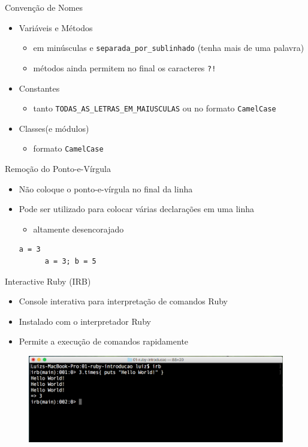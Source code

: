\begin{frame}[fragile,t]{Convenção de Nomes}
  \begin{itemize}
    \item Variáveis e Métodos
    \begin{itemize}
    	\item em minúsculas e \verb!separada_por_sublinhado! (tenha mais de uma palavra)
    	\item métodos ainda permitem no final os caracteres \verb|?!|
    \end{itemize}
    \item Constantes
    \begin{itemize}
    	\item tanto \verb!TODAS_AS_LETRAS_EM_MAIUSCULAS! ou no formato \verb!CamelCase!
    \end{itemize}
    \item Classes(e módulos)
    \begin{itemize}
    	\item formato \verb!CamelCase! 
    \end{itemize}
  \end{itemize}
\end{frame}

\begin{frame}[fragile,t]{Remoção do Ponto-e-Vírgula}
  \begin{itemize}
    \item Não coloque o ponto-e-vírgula no final da linha
    \item Pode ser utilizado para colocar várias declarações em uma linha
    \begin{itemize}
      \item altamente desencorajado
    \end{itemize}
    \begin{lstlisting}[style=RubyInputStyle]
      a = 3	
      a = 3; b = 5 
    \end{lstlisting}
  \end{itemize}
\end{frame}

\begin{frame}[fragile,t]{Interactive Ruby (IRB)}
  \begin{itemize}
    \item Console interativa para interpretação de comandos Ruby
    \item Instalado com o interpretador Ruby
    \item Permite a execução de comandos rapidamente
  \end{itemize}
  \begin{figure}[hbt]
    \includegraphics[scale=.25]{imagens/ruby-irb.png}
  \end{figure}
\end{frame}


